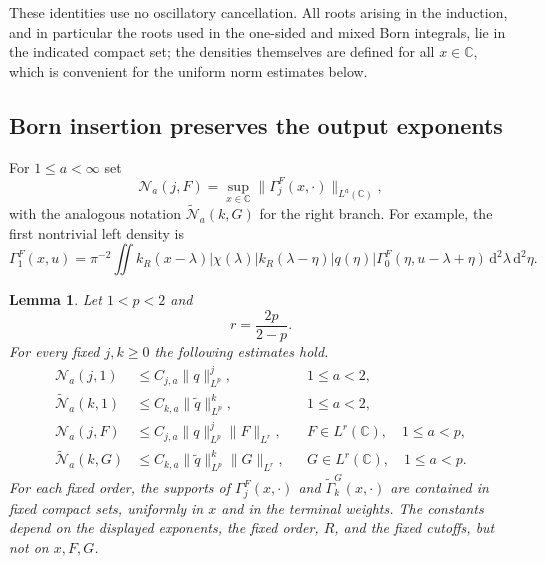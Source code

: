 \documentclass[a4paper,11pt]{article}
\newcommand{\C}{\mathbb{C}}
\newcommand{\dd}{\,\text{d}}
\theoremstyle{plain}
\newtheorem{lem}[thm]{Lemma}
\theoremstyle{definition}
\theoremstyle{remark}
\begin{document}
These identities use no oscillatory cancellation. All roots arising in the induction, and in particular the roots used in the
one-sided and mixed Born integrals, lie in the indicated compact set; the densities themselves are defined for
all $x\in\C$, which is convenient for the uniform norm estimates below.

\subsection{Born insertion preserves the output exponents}

For $1\le a<\infty$ set
\begin{equation}\label{branch-output-Ma}
 \mathcal N_a(j,F)=\sup_{x\in\C}
        \|\Gamma_j^F(x,\cdot)\|_{L^a(\C)},
\end{equation}
with the analogous notation $\widetilde{\mathcal N}_a(k,G)$ for the right
branch.  For example, the first nontrivial left density is
\[
 \Gamma_1^F(x,u)=\pi^{-2}\iint
 k_R(x-\lambda)|\chi(\lambda)|k_R(\lambda-\eta)|q(\eta)|
 \Gamma_0^F(\eta,u-\lambda+\eta)
 \dd^2\lambda\dd^2\eta.
\]

\begin{lem}
\label{lem-branch-output-bounds}
Let $1<p<2$ and
\[
        r=\frac{2p}{2-p}.
\]
For every fixed $j,k\ge0$ the following estimates hold.
\begin{align}
 \mathcal N_a(j,1)
 &\le C_{j,a}\|q\|_{L^p}^j,
 &&1\le a<2,                                      \label{branch-output-unweighted-left}\\
 \widetilde{\mathcal N}_a(k,1)
 &\le C_{k,a}\|\widetilde q\|_{L^p}^k,
 &&1\le a<2,                                      \label{branch-output-unweighted-right}\\
 \mathcal N_a(j,F)
 &\le C_{j,a}\|q\|_{L^p}^j\|F\|_{L^r},
 &&F\in L^r(\C),\quad 1\le a<p,                 \label{branch-output-weighted-left}\\
 \widetilde{\mathcal N}_a(k,G)
 &\le C_{k,a}\|\widetilde q\|_{L^p}^k\|G\|_{L^r},
 &&G\in L^r(\C),\quad 1\le a<p.                \label{branch-output-weighted-right}
\end{align}
For each fixed order, the supports of
$\Gamma_j^F(x,\cdot)$ and $\widetilde\Gamma_k^G(x,\cdot)$ are contained in
fixed compact sets, uniformly in $x$ and in the terminal weights.  The constants
depend on the displayed exponents, the fixed order, $R$, and the fixed cutoffs,
but not on $x,F,G$.
\end{lem}
\end{document}

